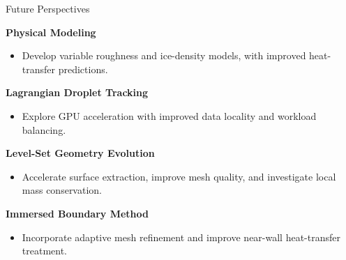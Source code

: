 \begin{frame}{Future Perspectives}

\vspace{0.15cm}

{\color{champsBlue}\bfseries Physical Modeling}

\vspace{0.10cm}
\begin{itemize}
    \item Develop variable roughness and ice-density models, with improved heat-transfer predictions.
\end{itemize}

\vspace{0.25cm}

{\color{champsBlue}\bfseries Lagrangian Droplet Tracking}

\vspace{0.10cm}
\begin{itemize}
    \item Explore GPU acceleration with improved data locality and workload balancing.
\end{itemize}

\vspace{0.25cm}

{\color{champsBlue}\bfseries Level-Set Geometry Evolution}

\vspace{0.10cm}
\begin{itemize}
    \item Accelerate surface extraction, improve mesh quality, and investigate local mass conservation.
\end{itemize}

\vspace{0.25cm}

{\color{champsBlue}\bfseries Immersed Boundary Method}

\vspace{0.10cm}
\begin{itemize}
    \item Incorporate adaptive mesh refinement and improve near-wall heat-transfer treatment.
\end{itemize}

\end{frame}


